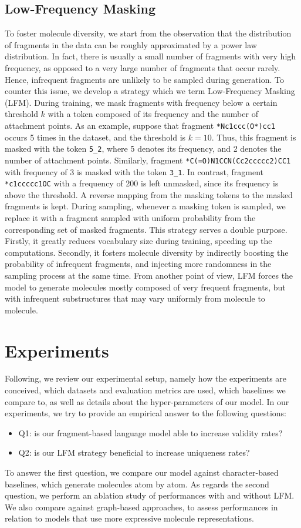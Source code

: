 \subsection{Low-Frequency Masking}
To foster molecule diversity, we start from the observation that the distribution of fragments in the data can be roughly approximated by a power law distribution. In fact, there is usually a small number of fragments with very high frequency, as opposed to a very large number of fragments that occur rarely. Hence, infrequent fragments are unlikely to be sampled during generation. To counter this issue, we develop a strategy which we term Low-Frequency Masking (LFM). During training, we mask fragments with frequency below a certain threshold $k$ with a token composed of its frequency and the number of attachment points. As an example, suppose that fragment \texttt{*Nc1ccc(O*)cc1} occurs 5 times in the dataset, and the threshold is $k=10$. Thus, this fragment is masked with the token \texttt{5\_2}, where 5 denotes its frequency, and 2 denotes the number of attachment points. Similarly, fragment \texttt{*C(=O)N1CCN(Cc2ccccc2)CC1} with frequency of 3 is masked with the token \texttt{3\_1}. In contrast, fragment \texttt{*c1ccccc1OC} with a frequency of 200 is left unmasked, since its frequency is above the threshold. A reverse mapping from the masking tokens to the masked fragments is kept. During sampling, whenever a masking token is sampled, we replace it with a fragment sampled with uniform probability from the corresponding set of masked fragments. This strategy serves a double purpose. Firstly, it greatly reduces vocabulary size during training, speeding up the computations. Secondly, it fosters molecule diversity by indirectly boosting the probability of infrequent fragments, and injecting more randomness in the sampling process at the same time. From another point of view, LFM forces the model to generate molecules mostly composed of very frequent fragments, but with infrequent substructures that may vary uniformly from molecule to molecule.

\section{Experiments}\label{sec:aistats-experiments}
Following, we review our experimental setup, namely how the experiments are conceived, which datasets and evaluation metrics are used, which baselines we compare to, as well as details about the hyper-parameters of our model. In our experiments, we try to provide an empirical answer to the following questions:
\begin{itemize}
    \item Q1: is our fragment-based language model able to increase validity rates?
    \item Q2: is our LFM strategy beneficial to increase uniqueness rates?
\end{itemize}
To answer the first question, we compare our model against character-based baselines, which generate molecules atom by atom. As regards the second question, we perform an ablation study of performances with and without LFM. We also compare against graph-based approaches, to assess performances in relation to models that use more expressive molecule representations.

